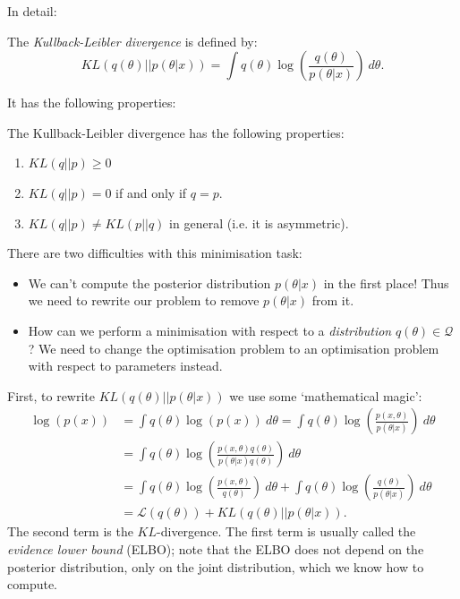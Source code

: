 In detail:
\begin{framedef}
The \textit{Kullback-Leibler divergence} is defined by:
\begin{equation*}
KL(q(\theta) || p(\theta | x)) = \int q(\theta) \log\left( \frac{q(\theta)}{p(\theta | x)} \right)\ d\theta.
\end{equation*}
\end{framedef}

It has the following properties:

\begin{frameprop}
The Kullback-Leibler divergence has the following properties:
\begin{enumerate}[label = (\roman*)]
\item $KL(q || p) \geq 0$
\item $KL(q || p) = 0$ if and only if $q = p$.
\item $KL(q || p) \neq KL(p || q)$ in general (i.e. it is asymmetric).
\end{enumerate}
\end{frameprop}


\newpage
There are two difficulties with this minimisation task:
\begin{itemize}
\item We can't compute the posterior distribution $p(\theta|x)$ in the first place! Thus we need to rewrite our problem to remove $p(\theta | x)$ from it.
\item How can we perform a minimisation with respect to a \textit{distribution} $q(\theta) \in \mathcal{Q}$? We need to change the optimisation problem to an optimisation problem with respect to parameters instead.
\end{itemize}

First, to rewrite $KL(q(\theta) || p(\theta |x))$ we use some `mathematical magic':
\begin{align*}
\log(p(x)) &= \int q(\theta) \log(p(x))\ d\theta = \int q(\theta) \log\left( \frac{p(x,\theta)}{p(\theta | x)} \right)\ d\theta\\[1.5ex]
&= \int q(\theta) \log\left( \frac{p(x,\theta) q(\theta)}{p(\theta | x) q(\theta)} \right)\ d\theta\\[1.5ex]
&= \int q(\theta) \log\left( \frac{p(x,\theta)}{q(\theta)} \right)\ d\theta + \int q(\theta) \log\left( \frac{q(\theta)}{p(\theta | x)} \right)\ d\theta\\[1.5ex]
&= \mathcal{L}(q(\theta)) + KL(q(\theta) || p(\theta | x)).
\end{align*}
The second term is the $KL$-divergence. The first term is usually called the \textit{evidence lower bound} (ELBO); note that the ELBO does not depend on the posterior distribution, only on the joint distribution, which we know how to compute.\\

